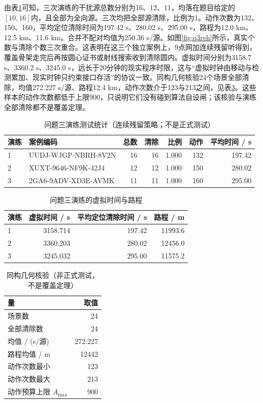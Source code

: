 \documentclass{cumcmthesis}
\begin{document}
由表\ref{tab:q3reh}可知，三次演练的干扰源总数分别为16、12、11，均落在题目给定的$[10,16]$内，且全部为全向源。三次均把全部源清除，比例为1。动作次数为132、150、160，平均定位清除时间为197.42 s、280.02 s、295.00 s，路程为12.0 km、12.5 km、11.6 km。合并不配对均值为250.36 s/源。如图\ref{fig:q3reh}所示，真实个数与清除个数三次重合。这表明在这三个独立案例上，9点网加连续残留听得到，覆盖骨架走完后再按圆心证书或射线搜索收到清除圆内。虚拟时间分别为3158.7 s、3360.2 s、3245.0 s，远长于20分钟的现实程序时限，这与“虚拟时钟由移动与检测累加、现实时钟只约束接口存活”的协议一致。同构几何核验24个场景全部清除，均值272.227 s/源、路程12.4 km，动作次数介于123与213之间，见表\ref{tab:q3twin}。这些样本的动作次数都低于上限900，只说明它们没有碰到算法自设闸；该核验与演练全部清除都不是覆盖定理。

\begin{table}[htbp]
\centering
\caption{问题三演练测试统计（连续残留策略；不是正式测试）}
\label{tab:q3reh}
\scriptsize
\begin{tabular}{llrrrrr}
\toprule
演练 & 案例编码 & 总数 & 清除 & 比例 & 动作 & 平均时间 / s \\
\midrule
1 & UUDJ-WJGP-NBRH-8V2N & 16 & 16 & 1.000 & 132 & 197.42 \\
2 & XUXT-9646-NF9K-42J4 & 12 & 12 & 1.000 & 150 & 280.02 \\
3 & 2GA6-9ADV-XD3E-AVMK & 11 & 11 & 1.000 & 160 & 295.00 \\
\bottomrule
\end{tabular}
\end{table}

\begin{table}[htbp]
\centering
\caption{问题三演练的虚拟时间与路程}
\label{tab:q3virt}
\begin{tabular}{lrrr}
\toprule
演练 & 虚拟时间 / s & 平均定位清除时间 / s & 路程 / m \\
\midrule
1 & 3158.714 & 197.42 & 11993.6 \\
2 & 3360.203 & 280.02 & 12456.0 \\
3 & 3245.032 & 295.00 & 11575.2 \\
\bottomrule
\end{tabular}
\end{table}

\begin{table}[htbp]
\centering
\caption{同构几何核验（非正式测试，不是覆盖定理）}
\label{tab:q3twin}
\begin{tabular}{lr}
\toprule
量 & 取值 \\
\midrule
场景数 & 24 \\
全部清除数 & 24 \\
均值 / (s/源) & 272.227 \\
路程均值 / m & 12442 \\
动作次数最小 & 123 \\
动作次数最大 & 213 \\
动作预算上限 $A_{\max}$ & 900 \\
\bottomrule
\end{tabular}
\end{table}
\end{document}
